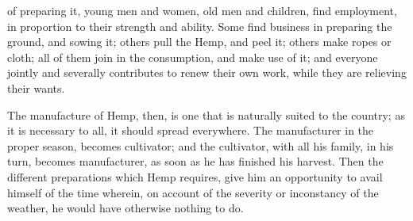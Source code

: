 \documentclass[a4paper, 11pt, oneside, polutonikogreek, english]{article}
\begin{document}
of preparing it, young men and women, old men and children, find employment, in proportion to their strength and ability. Some find business in preparing the ground, and sowing it; others pull the Hemp, and peel it; others make ropes or cloth; all of them join in the consumption, and make use of it; and everyone jointly and severally contributes to renew their own work, while they are relieving their wants.

The manufacture of Hemp, then, is one that is naturally suited to the country; as it is necessary to all, it should spread everywhere. The manufacturer in the proper season, becomes cultivator; and the cultivator, with all his family, in his turn, becomes manufacturer, as soon as he has finished his harvest. Then the different preparations which Hemp requires, give him an opportunity to avail himself of the time wherein, on account of the severity or inconstancy of the weather, he would have otherwise nothing to do.
\end{document}
